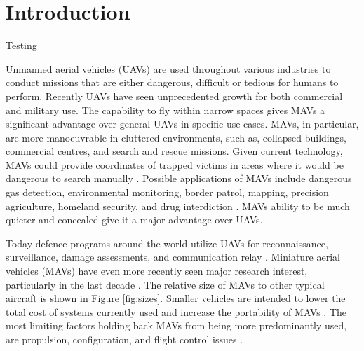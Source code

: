 \graphicspath{{./Figs/}}

\chapter{Introduction} 
\label{sec:Background}
Testing



Unmanned aerial vehicles (UAVs) are used throughout various industries to conduct missions that are either dangerous, difficult or tedious for humans to perform. Recently UAVs have seen unprecedented growth for both commercial \cite{Liu2014} and military \cite{Chaturvedi2019} \cite{Fan2018} use. The capability to fly within narrow spaces gives MAVs a significant advantage over general UAVs in specific use cases. MAVs, in particular, are more manoeuvrable in cluttered environments, such as, collapsed buildings, commercial centres, and search and rescue missions. Given current technology, MAVs could provide coordinates of trapped victims in areas where it would be dangerous to search manually  \cite{Valavanis2007}. Possible applications of MAVs include dangerous gas detection, environmental monitoring, border patrol, mapping, precision agriculture, homeland security, and drug interdiction \cite{Liu2014} \cite{Valavanis2007}. MAVs ability to be much quieter and concealed give it a major advantage over UAVs.


Today defence programs around the world utilize UAVs for reconnaissance, surveillance, damage assessments, and communication relay \cite{Chaturvedi2019} \cite{Fan2018} \cite{Valavanis2007}. Miniature aerial vehicles (MAVs) have even more recently seen major research interest, particularly in the last decade \cite{Valavanis2007}.  The relative size of MAVs to other typical aircraft is shown in Figure \ref{fig:sizes}. Smaller vehicles are intended to lower the total cost of systems currently used and increase the portability of MAVs \cite{Stephen2022}. The most limiting factors holding back MAVs from being more predominantly used, are propulsion, configuration, and flight control issues \cite{Stephen2022}.


